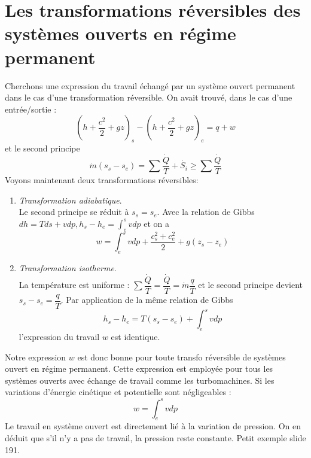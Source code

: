 	\section{Les transformations réversibles des systèmes ouverts en régime permanent}
	Cherchons une expression du travail échangé par un système ouvert permanent dans le 
	cas d'une transformation réversible. On avait trouvé, dans le cas d'une entrée/sortie :
	\begin{equation}
	\left(h+\dfrac{c^2}{2}+gz\right)_s - \left(h+\dfrac{c^2}{2}+gz\right)_e = q+w
	\end{equation}
	et le second principe
 	\begin{equation}
 	\dot{m}(s_s-s_e)=\sum\dfrac{\dot{Q}}{T}+\dot{S_i}\geq \sum\dfrac{\dot{Q}}{T}
 	\end{equation}
 	Voyons maintenant deux transformations réversibles:
 	\begin{enumerate}
 	\item \textit{Transformation adiabatique}.\\
 	Le second principe se réduit à $s_s=s_e$. Avec la relation de Gibbs $dh = Tds+vdp, 
 	h_s-h_e = \int_e^s vdp$ et on a 
 	\begin{equation}
 	w = \int_e^s vdp +\dfrac{c_s^2+c_e^2}{2} + g(z_s-z_e)
 	\end{equation}
 	\item \textit{Transformation isotherme}.\\ 	
 	La température est uniforme : $\sum \dfrac{\dot{Q}}{T} = \dfrac{\dot{Q}}{T}=\dot{m}
 	\dfrac{q}{T}$ et le second principe devient $s_s-s_e = \dfrac{q}{T}$. Par application 
 	de la même relation de Gibbs
 	\begin{equation}
 	h_s-h_e = T(s_s-s_e) + \int_e^s vdp
 	\end{equation}
 	l'expression du travail $w$ est identique.
 	\end{enumerate}
 	Notre expression $w$ est donc bonne pour toute transfo réversible de systèmes ouvert 
 	en régime permanent. Cette expression est employée pour tous les systèmes ouverts avec
	échange de travail comme les turbomachines. Si les variations d’énergie cinétique et 
	potentielle sont négligeables :
	\begin{equation}
	w = \int_e^s vdp
	\end{equation}
	Le travail en système ouvert est directement lié à la variation de pression. On en 
	déduit que s'il n'y a pas de travail, la pression reste constante. Petit exemple slide 
	191.
	
